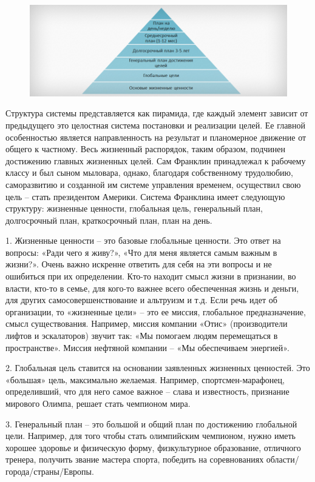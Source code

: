 \label{page:domain:piramida_franklina}
\begin{figure}
\centering
  \includegraphics[scale=0.5]{images/franklin_piramida.jpg}  
\end{figure}


Структура системы представляется как пирамида, где каждый элемент зависит от предыдущего это целостная система постановки и реализации целей. Ее главной особенностью является направленность на результат и планомерное движение от общего к частному. Весь жизненный распорядок, таким образом, подчинен достижению главных жизненных целей. Сам Франклин принадлежал к рабочему классу и был сыном мыловара, однако, благодаря собственному трудолюбию, саморазвитию и созданной им системе управления временем, осуществил свою цель – стать президентом Америки. 
Система Франклина имеет следующую структуру: жизненные ценности, глобальная цель, генеральный план, долгосрочный план, краткосрочный план, план на день. 


1. Жизненные ценности – это базовые глобальные ценности. Это ответ на вопросы: «Ради чего я живу?», «Что для меня является самым важным в жизни?». Очень важно искренне ответить для себя на эти вопросы и не ошибиться при их определении. Кто-то находит смысл жизни в признании, во власти, кто-то в семье, для кого-то важнее всего обеспеченная жизнь и деньги, для других самосовершенствование и альтруизм и т.д. Если речь идет об организации, то «жизненные цели» – это ее миссия, глобальное предназначение, смысл существования. Например, миссия компании «Отис» (производители лифтов и эскалаторов) звучит так: «Мы помогаем людям перемещаться в пространстве». Миссия нефтяной компании – «Мы обеспечиваем энергией». 

2. Глобальная цель ставится на основании заявленных жизненных ценностей. Это «большая» цель, максимально желаемая. Например, спортсмен-марафонец, определивший, что для него самое важное – слава и известность, признание мирового Олимпа, решает стать чемпионом мира. 

3. Генеральный план – это большой и общий план по достижению глобальной цели. Например, для того чтобы стать олимпийским чемпионом, нужно иметь хорошее здоровье и физическую форму, физкультурное образование, отличного тренера, получить звание мастера спорта, победить на соревнованиях области/города/страны/Европы. 

